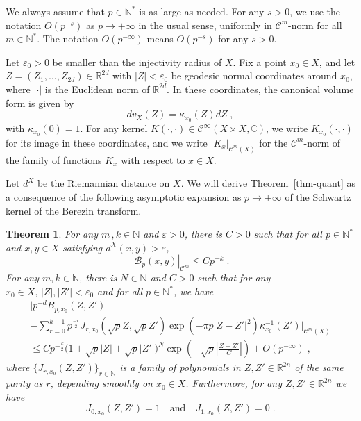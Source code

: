 \documentclass[11pt]{article}
\newtheorem{theo}{Theorem}[section]
\theoremstyle{definition}
\numberwithin{equation}{section}
\numberwithin{figure}{section}
\numberwithin{table}{section}
\newcommand{\R}{{\mathbb{R}}}
\newcommand{\N}{{\mathbb{N}}}
\newcommand{\CCC}{{\mathbb{C}}}
\newcommand{\CC}{\mathcal{C}}
\newcommand{\cB}{{\mathcal{B}}}
\renewcommand\leq {\leqslant}
\newcommand\< {\mathcal{h}}
\renewcommand\> {\mathcal{i}}
\newcommand{\cinf}{\CC^\infty}
\renewcommand{\epsilon}{\varepsilon}
\newcommand*\cC{\mathscr{C}}
\newcommand\fl {\rightarrow}
\begin{document}
We always assume that $p\in\N^*$ is as large as needed. For any $s>0$, we use the notation $O(p^{-s})$ as $p\fl+\infty$ in the usual sense, uniformly in $\cC^m$-norm for all $m\in\N^*$. The notation $O(p^{-\infty})$ means $O(p^{-s})$ for any $s>0$.

Let $\epsilon_0>0$ be smaller than the injectivity radius of $X$. Fix a point $x_0 \in X$, and let $Z=(Z_1,\dots,Z_{2d})\in\R^{2d}$ with $|Z|<\epsilon_0$ be geodesic normal coordinates around $x_0$, where $|\cdot|$ is the Euclidean norm of $\R^{2d}$. In these coordinates, the canonical volume form is given by
\begin{equation}\label{defkappa}
dv_X(Z)=\kappa_{x_0}(Z)dZ\;,
\end{equation}
with $\kappa_{x_0}(0)=1$. For any kernel $K(\cdot,\cdot)\in\cinf(X\times X,\CCC)$, we write $K_{x_0}(\cdot,\cdot)$ for its image in these coordinates, and we write $|K_x|_{\cC^m(X)}$ for the $\cC^m$-norm of the family of functions $K_x$ with respect to $x \in X$.

Let $d^X$ be the Riemannian distance on $X$. We will derive Theorem~\ref{thm-quant} as a consequence of the following asymptotic expansion as $p \to +\infty$ of the Schwartz kernel of the Berezin transform.

\begin{theo}\label{BTasy}
For any $m\,,k\in\N$ and $\epsilon>0$, there is $C>0$ such that for all $p\in\N^*$ and $x,y\in X$ satisfying $d^X(x,y)>\epsilon$,
\begin{equation}\label{thetafla}
|\cB_p(x,y)|_{\cC^m}\leq Cp^{-k}\;.
\end{equation}
For any $m, k\in\N$, there is $N\in\N$ and $C>0$ such that for any $x_0\in X,\,|Z|,|Z'|<\epsilon_0$ and for all $p\in\N^*$, we have
\begin{multline}\label{BTexp}
\Big|p^{-d} B_{p,x_0}(Z,Z')\\
-\sum_{r=0}^{k-1} p^{\frac{-r}{2}}J_{r,x_0}(\sqrt{p}Z,\sqrt{p}Z')
\exp(-\pi p|Z-Z'|^2)\kappa_{x_0}^{-1}(Z')\Big|_{\cC^m(X)}\\
\leq Cp^{-\frac{k}{2}}\big(1+\sqrt{p}|Z|+\sqrt{p}|Z'|\big)^N
\exp\left(-\sqrt{p}\left|\frac{Z-Z'}{C}\right|\right)+O(p^{-\infty})\;,
\end{multline}
where $\{J_{r,x_0}(Z,Z')\}_{r\in\N}$ is a family of polynomials in $Z,Z'\in\R^{2n}$ of the same parity as $r$, depending smoothly on $x_0\in X$. Furthermore, for any $Z,Z'\in\R^{2n}$ we have
\begin{equation}\label{|J|0}
J_{0,x_0}(Z,Z')=1\quad\text{and}\quad J_{1,x_0}(Z,Z')=0\;.
\end{equation}
\end{theo}
\end{document}
